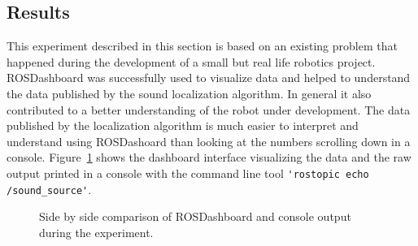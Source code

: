 \subsection{Results}
This experiment described in this section is based on an existing problem that happened during the development of a small but real life robotics project. ROSDashboard was successfully used to visualize data and helped to understand the data published by the sound localization algorithm. In general it also contributed to a better understanding of the robot under development. The data published by the localization algorithm is much easier to interpret and understand using ROSDashoard than looking at the numbers scrolling down in a console. Figure~\ref{comparison} shows the dashboard interface visualizing the data and the raw output printed in a console with the command line tool \verb+'rostopic echo /sound_source'+.

\begin{figure}[ht]
\centering
{}
\caption{Side by side comparison of ROSDashboard and console output during the experiment.}
\label{comparison}
\end{figure}
